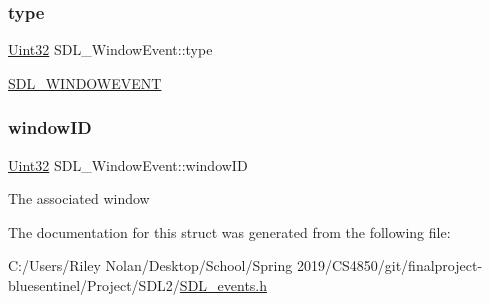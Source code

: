 \subsubsection{\texorpdfstring{type}{type}}
{\footnotesize\ttfamily \mbox{\hyperlink{_s_d_l__stdinc_8h_add440eff171ea5f55cb00c4a9ab8672d}{Uint32}} S\+D\+L\+\_\+\+Window\+Event\+::type}

\mbox{\hyperlink{_s_d_l__events_8h_a3b589e89be6b35c02e0dd34a55f3fccaa5ff4e41f0d8b5def11cfe6a69ec0b698}{S\+D\+L\+\_\+\+W\+I\+N\+D\+O\+W\+E\+V\+E\+NT}} \mbox{\label{struct_s_d_l___window_event_a4b31796ffc84fbb7f6e9ba33e127619a}} 
\subsubsection{\texorpdfstring{windowID}{windowID}}
{\footnotesize\ttfamily \mbox{\hyperlink{_s_d_l__stdinc_8h_add440eff171ea5f55cb00c4a9ab8672d}{Uint32}} S\+D\+L\+\_\+\+Window\+Event\+::window\+ID}

The associated window 

The documentation for this struct was generated from the following file\+:\begin{DoxyCompactItemize}
\item 
C\+:/\+Users/\+Riley Nolan/\+Desktop/\+School/\+Spring 2019/\+C\+S4850/git/finalproject-\/bluesentinel/\+Project/\+S\+D\+L2/\mbox{\hyperlink{_s_d_l__events_8h}{S\+D\+L\+\_\+events.\+h}}\end{DoxyCompactItemize}
